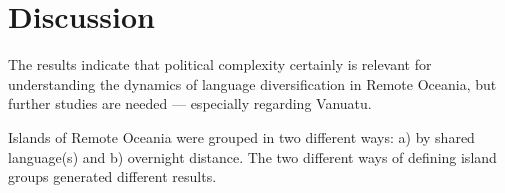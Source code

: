 \documentclass[a4paper,10pt]{article} %
\begin{document}







\FloatBarrier
\section{Discussion}
\label{pol_study_discisson}
The results indicate that political complexity certainly is relevant for understanding the dynamics of language diversification in Remote Oceania, but further studies are needed --- especially regarding Vanuatu.

Islands of Remote Oceania were grouped in two different ways: a) by shared language(s) and b) overnight distance. The two different ways of defining island groups generated different results. 
\end{document}
